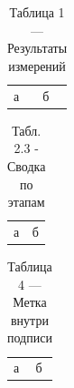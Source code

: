 \begin{table}
  \caption{Таблица 1 — Результаты измерений} %
  \begin{tabular}{ll}
    а & б \\
  \end{tabular}
\end{table}

\begin{table}
  \caption{Табл. 2.3 - Сводка по этапам} %
  \begin{tabular}{ll}
    а & б \\
  \end{tabular}
\end{table}

\begin{table}
  \caption{Таблица 4 — Метка внутри подписи\label{tab:inside}} %
  \begin{tabular}{ll}
    а & б \\
  \end{tabular}
\end{table}
